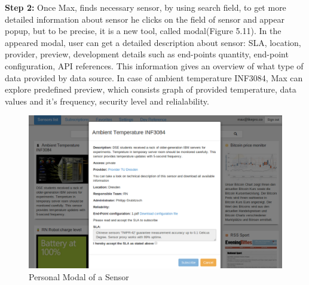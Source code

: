 \textbf{Step 2:} Once Max, finds necessary sensor, by using search field, to get more detailed information about sensor he clicks on the field of sensor and appear popup, but to be precise, it is a new tool, called modal(Figure 5.11). In the appeared modal, user can get a detailed description about sensor: SLA, location, provider, preview, development details such as end-points quantity, end-point configuration, API references. This information gives an overview of what type of data provided by data source. In case of ambient temperature INF3084, Max can explore predefined preview, which consists graph of provided temperature, data values and it's frequency, security level and relialability. 
\begin{figure}[!ht]
\centering
\includegraphics[scale=0.6]{Screenshots/UseCaseScreenshot2.png}   
\caption[Personal Modal of a Sensor]{Personal Modal of a Sensor}                         
\end{figure}

